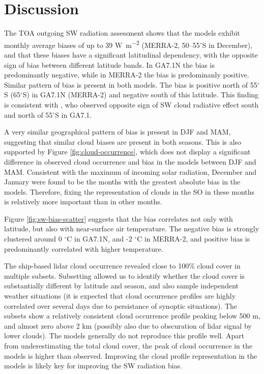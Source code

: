 \section{Discussion}

The TOA outgoing SW radiation assessment shows that the models exhibit monthly
average biases of up to 39 \unit{W m^{-2}} (MERRA-2, 50--55$^\circ$S in
December), and that these biases have a significant latitudinal dependency,
with the opposite sign of bias between different latitude bands. In GA7.1N the
bias is predominantly negative, while in MERRA-2 the bias is predominanly
positive. Similar pattern of bias is present in both models. The bias is positive
north of 55$^\circ$S (65$^\circ$S) in GA7.1N (MERRA-2) and negative south of
this latitude.
This finding is consistent with \cite{schuddeboom2019}, who observed opposite
sign of SW cloud radiative effect south and north of 55$^\circ$S in GA7.1.

A very similar geographical pattern of bias is present in DJF and
MAM, suggesting that similar cloud biases are present in both seasons. This
is also supported by Figure \ref{fig:cloud-occurrence}, which does not display
a significant difference in observed cloud occurrence and bias in the models
between DJF and MAM.  Consistent with the maximum of incoming solar radiation,
December and January were found to be the months with the greatest absolute
bias in the models. Therefore, fixing the representation of clouds in the SO
in these months is relatively more important than in other months.

Figure \ref{fig:sw-bias-scatter} suggests that the bias correlates not only
with latitude, but also with near-surface air temperature. The negative bias
is strongly clustered around 0 $^\circ$C in GA7.1N, and -2 $^\circ$C in
MERRA-2, and positive bias is predominantly correlated with higher temperature.

The ship-based lidar cloud occurrence revealed close to 100\% cloud cover in
multiple subsets. Subsetting allowed us to identify whether the cloud cover is
substantially different by latitude and season, and also sample independent
weather situations (it is expected that cloud occurrence profiles are highly
correlated over several days due to persistance of synoptic situations). The
subsets show a relatively consistent cloud occurrence profile peaking below 500
m, and almost zero above 2 km (possibly also due to
obscuration of lidar signal by lower clouds). The models generally do not
reproduce this profile well. Apart from underestimating the total cloud cover,
the peak of cloud occurrence in the models is higher than observed. Improving
the cloud profile representation in the models is likely key for improving the
SW radiation bias.

